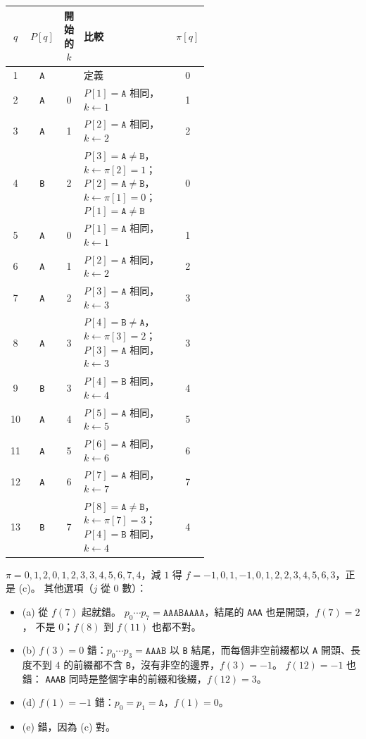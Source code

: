 \begin{center}
\small
\begin{tabular}{ccc>{\raggedright\arraybackslash}p{0.56\linewidth}c}
\toprule
$q$ & $P[q]$ & 開始的 $k$ & 比較 & $\pi[q]$ \\
\midrule
1 & \texttt{A} & & 定義 & 0 \\
2 & \texttt{A} & 0 & $P[1]=\mathtt{A}$ 相同，$k\gets1$ & 1 \\
3 & \texttt{A} & 1 & $P[2]=\mathtt{A}$ 相同，$k\gets2$ & 2 \\
4 & \texttt{B} & 2 & $P[3]=\mathtt{A}\ne\mathtt{B}$，$k\gets\pi[2]=1$；$P[2]=\mathtt{A}\ne\mathtt{B}$，$k\gets\pi[1]=0$；$P[1]=\mathtt{A}\ne\mathtt{B}$ & 0 \\
5 & \texttt{A} & 0 & $P[1]=\mathtt{A}$ 相同，$k\gets1$ & 1 \\
6 & \texttt{A} & 1 & $P[2]=\mathtt{A}$ 相同，$k\gets2$ & 2 \\
7 & \texttt{A} & 2 & $P[3]=\mathtt{A}$ 相同，$k\gets3$ & 3 \\
8 & \texttt{A} & 3 & $P[4]=\mathtt{B}\ne\mathtt{A}$，$k\gets\pi[3]=2$；$P[3]=\mathtt{A}$ 相同，$k\gets3$ & 3 \\
9 & \texttt{B} & 3 & $P[4]=\mathtt{B}$ 相同，$k\gets4$ & 4 \\
10 & \texttt{A} & 4 & $P[5]=\mathtt{A}$ 相同，$k\gets5$ & 5 \\
11 & \texttt{A} & 5 & $P[6]=\mathtt{A}$ 相同，$k\gets6$ & 6 \\
12 & \texttt{A} & 6 & $P[7]=\mathtt{A}$ 相同，$k\gets7$ & 7 \\
13 & \texttt{B} & 7 & $P[8]=\mathtt{A}\ne\mathtt{B}$，$k\gets\pi[7]=3$；$P[4]=\mathtt{B}$ 相同，$k\gets4$ & 4 \\
\bottomrule
\end{tabular}
\end{center}

$\pi = 0, 1, 2, 0, 1, 2, 3, 3, 4, 5, 6, 7, 4$，減 $1$ 得
$f = -1, 0, 1, -1, 0, 1, 2, 2, 3, 4, 5, 6, 3$，正是 (c)。 其他選項（$j$ 從 $0$ 數）：
\begin{itemize}
\item (a) 從 $f(7)$ 起就錯。 $p_0 \cdots p_7 = \mathtt{AAABAAAA}$，結尾的 \texttt{AAA} 也是開頭，$f(7) = 2$，
不是 $0$；$f(8)$ 到 $f(11)$ 也都不對。
\item (b) $f(3) = 0$ 錯：$p_0 \cdots p_3 = \mathtt{AAAB}$ 以 \texttt{B} 結尾，而每個非空前綴都以 \texttt{A}
開頭、長度不到 $4$ 的前綴都不含 \texttt{B}，沒有非空的邊界，$f(3) = -1$。 $f(12) = -1$ 也錯：
\texttt{AAAB} 同時是整個字串的前綴和後綴，$f(12) = 3$。
\item (d) $f(1) = -1$ 錯：$p_0 = p_1 = \mathtt{A}$，$f(1) = 0$。
\item (e) 錯，因為 (c) 對。
\end{itemize}

